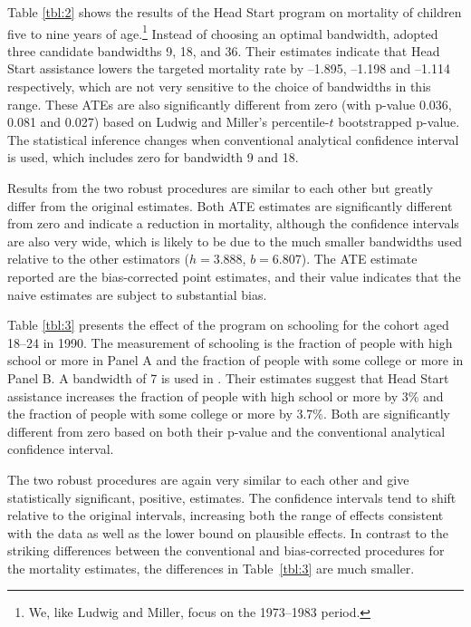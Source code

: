 \documentclass[12pt,fleqn]{article}
\begin{document}
Table \ref{tbl:2} shows the results of the Head Start program on mortality of
children five to nine years of age.\footnote{%
  We, like Ludwig and Miller, focus on the 1973--1983 period.} %
Instead of choosing an optimal bandwidth, \cite{ludwig2007} adopted three
candidate bandwidths 9, 18, and 36. Their estimates indicate that Head Start
assistance lowers the targeted mortality rate by --1.895, --1.198 and --1.114
respectively, which are not very sensitive to the choice of bandwidths in this
range. These ATEs are also significantly different from zero (with p-value
0.036, 0.081 and 0.027) based on Ludwig and Miller's percentile-$t$ bootstrapped
p-value. The statistical inference changes when conventional analytical
confidence interval is used, which includes zero for bandwidth 9 and 18.

Results from the two robust procedures are similar to each other but greatly
differ from the original estimates. Both ATE estimates are significantly different from
zero and indicate a reduction in mortality, although the confidence intervals are
also very wide, which is likely to be
due to the much smaller bandwidths used relative to the other estimators
($h=3.888$, $b=6.807$). The ATE estimate reported are the bias-corrected
point estimates, and their value indicates that the naive estimates are
subject to substantial bias.

Table \ref{tbl:3} presents the effect of the program on schooling for the cohort
aged 18--24 in 1990. The measurement of schooling is the fraction of people with
high school or more in Panel A and the fraction of people with some college or
more in Panel B. A bandwidth of 7 is used in \cite{ludwig2007}. Their estimates
suggest that Head Start assistance increases the fraction of people with high
school or more by 3\% and the fraction of people with some college or more by
3.7\%. Both are significantly different from zero based on both their p-value
and the conventional analytical confidence interval.

The two robust procedures are again very similar to each other and give
statistically significant, positive, estimates. The confidence intervals tend to shift
relative to the original intervals, increasing both the range of effects consistent
with the data as well as the lower bound on plausible effects.
In contrast to the striking differences between the conventional
and bias-corrected procedures for the mortality estimates, the differences
in Table~\ref{tbl:3} are much smaller.
\end{document}
